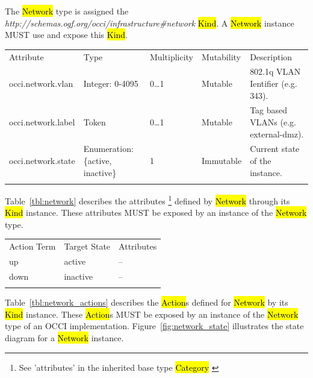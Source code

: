 \documentclass[10pt,a4paper]{article}
\begin{document}
The \hl{Network} type is assigned the \textit{http://schemas.ogf.org/occi/infrastructure\#network} \hl{Kind}. A \hl{Network} instance MUST use and expose this \hl{Kind}.

{
	\begin{tabular}{lp{2.5cm}p{1cm}lp{6cm}}
	\toprule
	Attribute&Type&Multi\-plicity&Mutability&Description\\
	\colrule
	occi.network.vlan & Integer: 0-4095 & 0\ldots1 & Mutable 
	& 802.1q VLAN Ientifier (e.g. 343).\\
	occi.network.label & Token & 0\ldots1 & Mutable 
	& Tag based VLANs (e.g. external-dmz).\\
	occi.network.state & Enumeration: \{active, inactive\} & 1 & Immutable 
	& Current state of the instance.\\
	\botrule
	\end{tabular}
}
Table~\ref{tbl:network} describes the attributes \footnote{See ’attributes’ in the inherited 
base type \hl{Category}  \cite{occi:core}} 
defined by \hl{Network} through its \hl{Kind} instance. These attributes
MUST be exposed by an instance of the \hl{Network} type.

{
	\begin{tabular}{lll}
	\toprule
	Action Term&Target State&Attributes\\
	\colrule
	up & active & --\\
	down & inactive & --\\
	\botrule
	\end{tabular}
}

Table~\ref{tbl:network_actions} describes the \hl{Action}s defined for
\hl{Network} by its \hl{Kind} instance. These \hl{Action}s MUST be exposed 
by an instance of the \hl{Network} type of an OCCI implementation. 
Figure~\ref{fig:network_state} illustrates the state diagram for a \hl{Network} instance.
\end{document}
